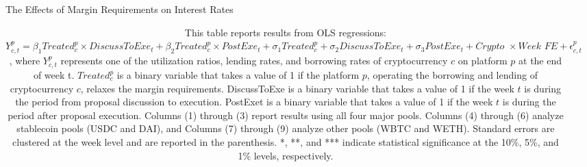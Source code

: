 \clearpage
\newpage
\setlength{\tabcolsep}{1pt}
    \begin{landscape}
        

\begin{table}[ht!]
\caption{The Effects of Margin Requirements on Interest Rates}\label{tab:interestrates}
\caption*{This table reports results from OLS regressions: $Y_{c,t}^p= \beta_1Treated_{c}^{p}\times DiscussToExe_t + \beta_2Treated^{p}_{c}\times PostExe_{t} + \sigma_1Treated^p_{c} + \sigma_2 DiscussToExe_t+\sigma_3 PostExe_{t} + \textit{Crypto }\times\textit{Week FE}+\epsilon_{c,t}^p$, where $Y_{c,t}^p$ represents one of the utilization ratios, lending rates, and borrowing rates of cryptocurrency $c$ on platform $p$ at the end of week t. $Treated^{p}_{c}$ is a binary variable that takes a value of 1 if the platform $p$, operating the borrowing and lending of cryptocurrency $c$, relaxes the margin requirements. DiscussToExe is a binary variable that takes a value of 1 if the week $t$ is during the period from proposal discussion to execution. PostExet is a binary variable that takes a value of 1 if the week $t$ is during the period after proposal execution. Columns (1) through (3) report results using all four major pools. Columns (4) through (6) analyze stablecoin pools (USDC and DAI), and Columns (7) through (9) analyze other pools (WBTC and WETH). Standard errors are clustered at the week level and are reported in the parenthesis. *, **, and *** indicate statistical significance at the 10\%, 5\%, and 1\% levels, respectively. }


\centering
\def\sym#1{\ifmmode^{#1}\else\(^{#1}\)\fi}


\begin{tabular*}{\linewidth}{@{\extracolsep{\fill}}lccccccccc}
    \toprule


\end{tabular*}
\end{table}
\end{landscape}
